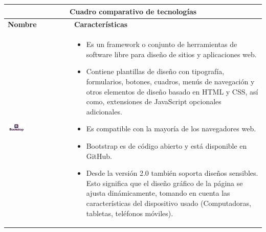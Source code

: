 \begin{table}[b!]
    \centering
      \begin{tabular}{|p{1cm}|l}
        \hline
        \multicolumn{2}{|c|}{{\bf Cuadro comparativo de tecnologías}} \\ 
        \hline
          \multicolumn{1}{|p{4cm}|}{{\bf Nombre}} & 
		  \multicolumn{1}{p{10cm}|}{{\bf Características}}\\
		 \hline
          \multicolumn{1}{|p{5cm}|}{\includegraphics[width=0.3\textwidth]{images/bootstrap}} & 
          \multicolumn{1}{p{10cm}|}{\begin{itemize} 
       \vspace{-20mm}
          \item Es un framework o conjunto de herramientas de software libre para diseño de sitios y aplicaciones web. 
        \item Contiene plantillas de diseño con tipografía, formularios, botones, cuadros, menús de navegación y otros elementos de diseño basado en HTML y CSS, así como, extensiones de JavaScript opcionales adicionales.
        \item Es compatible con la mayoría de los navegadores web.
        \item Bootstrap es de código abierto y está disponible en GitHub. 
        \item Desde la versión 2.0 también soporta diseños sensibles. Esto significa que el diseño gráfico de la página se ajusta dinámicamente, tomando en cuenta las características del dispositivo usado (Computadoras, tabletas, teléfonos móviles).
      \end{itemize}} \\
         

\end{tabular}
\end{table}

